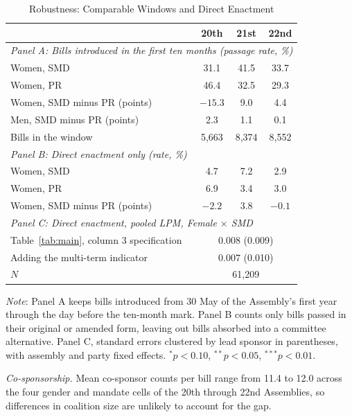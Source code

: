 \documentclass[11pt]{article}
\begin{document}
\begin{table}[htbp]
\centering
\caption{Robustness: Comparable Windows and Direct Enactment}
\label{tab:robust}
\small
\begin{tabular}{p{}ccc}
\toprule
& 20th & 21st & 22nd \\
\midrule
\multicolumn{4}{l}{\textit{Panel A: Bills introduced in the first ten months (passage rate, \%)}} \\[3pt]
Women, SMD & 31.1 & 41.5 & 33.7 \\
Women, PR & 46.4 & 32.5 & 29.3 \\
Women, SMD minus PR (points) & $-15.3$ & 9.0 & 4.4 \\
Men, SMD minus PR (points) & 2.3 & 1.1 & 0.1 \\
Bills in the window & 5,663 & 8,374 & 8,552 \\
\midrule
\multicolumn{4}{l}{\textit{Panel B: Direct enactment only (rate, \%)}} \\[3pt]
Women, SMD & 4.7 & 7.2 & 2.9 \\
Women, PR & 6.9 & 3.4 & 3.0 \\
Women, SMD minus PR (points) & $-2.2$ & 3.8 & $-0.1$ \\
\midrule
\multicolumn{4}{l}{\textit{Panel C: Direct enactment, pooled LPM, Female $\times$ SMD}} \\[3pt]
Table~\ref{tab:main}, column 3 specification & \multicolumn{3}{c}{$0.008$ (0.009)} \\
Adding the multi-term indicator & \multicolumn{3}{c}{$0.007$ (0.010)} \\
$N$ & \multicolumn{3}{c}{61,209} \\
\bottomrule
\end{tabular}

\vspace{4pt}
\parbox{0.92\textwidth}{\footnotesize \textit{Note}: Panel A keeps bills introduced from 30 May of the Assembly's first year through the day before the ten-month mark. Panel B counts only bills passed in their original or amended form, leaving out bills absorbed into a committee alternative. Panel C, standard errors clustered by lead sponsor in parentheses, with assembly and party fixed effects. $^*p<0.10$, $^{**}p<0.05$, $^{***}p<0.01$.}
\end{table}

\textit{Co-sponsorship.} Mean co-sponsor counts per bill range from 11.4 to 12.0 across the four gender and mandate cells of the 20th through 22nd Assemblies, so differences in coalition size are unlikely to account for the gap.
\end{document}
